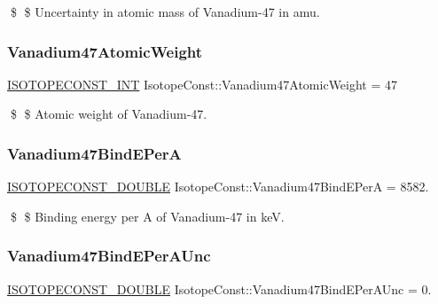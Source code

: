 \$ \$ Uncertainty in atomic mass of Vanadium-\/47 in amu. \mbox{\label{group___isotope_const-_vanadium-_v47_ga2101a4926e64ec7a32cbdcb673410305}} 
\subsubsection{\texorpdfstring{Vanadium47\+Atomic\+Weight}{Vanadium47AtomicWeight}}
{\footnotesize\ttfamily \mbox{\hyperlink{group___isotope_const-_macros_ga5f18360b3e99483a35c32d789e62621c}{I\+S\+O\+T\+O\+P\+E\+C\+O\+N\+S\+T\+\_\+\+I\+NT}} Isotope\+Const\+::\+Vanadium47\+Atomic\+Weight = 47}

\$ \$ Atomic weight of Vanadium-\/47. \mbox{\label{group___isotope_const-_vanadium-_v47_gae33fc9a78e8029dad0306a8ad6c36ce4}} 
\subsubsection{\texorpdfstring{Vanadium47\+Bind\+E\+PerA}{Vanadium47BindEPerA}}
{\footnotesize\ttfamily \mbox{\hyperlink{group___isotope_const-_macros_ga8f45a7272ce02c0b4c65c44636ed719a}{I\+S\+O\+T\+O\+P\+E\+C\+O\+N\+S\+T\+\_\+\+D\+O\+U\+B\+LE}} Isotope\+Const\+::\+Vanadium47\+Bind\+E\+PerA = 8582.}

\$ \$ Binding energy per A of Vanadium-\/47 in keV. \mbox{\label{group___isotope_const-_vanadium-_v47_ga8e23965be19adab51ab621bf7b777979}} 
\subsubsection{\texorpdfstring{Vanadium47\+Bind\+E\+Per\+A\+Unc}{Vanadium47BindEPerAUnc}}
{\footnotesize\ttfamily \mbox{\hyperlink{group___isotope_const-_macros_ga8f45a7272ce02c0b4c65c44636ed719a}{I\+S\+O\+T\+O\+P\+E\+C\+O\+N\+S\+T\+\_\+\+D\+O\+U\+B\+LE}} Isotope\+Const\+::\+Vanadium47\+Bind\+E\+Per\+A\+Unc = 0.}

